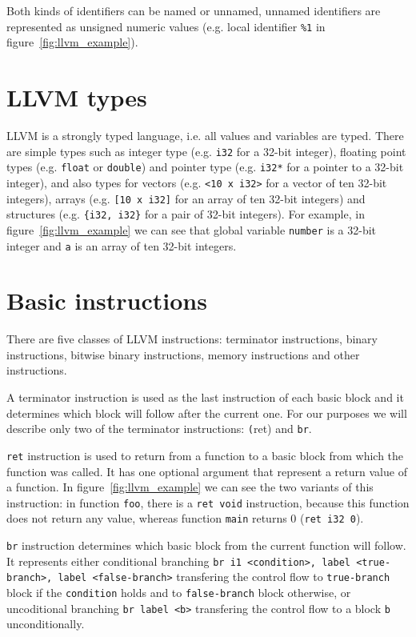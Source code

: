 Both kinds of identifiers can be named or unnamed, unnamed identifiers are
represented as unsigned numeric values (e.g. local identifier \texttt{\%1} in
figure~\ref{fig:llvm_example}).

\section{LLVM types}

LLVM is a strongly typed language, i.e. all values and variables are typed.
There are simple types such as integer type (e.g. \texttt{i32} for a 32-bit
integer), floating point types (e.g. \texttt{float} or \texttt{double}) and
pointer type (e.g. \texttt{i32*} for a pointer to a 32-bit integer), and also
types for vectors (e.g. \texttt{<10 x i32>} for a vector of ten 32-bit
integers), arrays (e.g. \texttt{[10 x i32]} for an array of ten 32-bit integers)
and structures (e.g. \texttt{\{i32, i32\}} for a pair of 32-bit integers). For
example, in figure~\ref{fig:llvm_example} we can see that global variable
\texttt{number} is a 32-bit integer and \texttt{a} is an array of ten
32-bit integers.

\section{Basic instructions}

There are five classes of LLVM instructions: terminator instructions, binary
instructions, bitwise binary instructions, memory instructions and other
instructions.

A terminator instruction is used as the last instruction of each basic block
and it determines which block will follow after the current one. For our
purposes we will describe only two of the terminator instructions: \texttt(ret)
and \texttt{br}.

\texttt{ret} instruction is used to return from a function to a basic block
from which the function was called. It has one optional argument that represent
a return value of a function. In figure~\ref{fig:llvm_example} we can see the
two variants of this instruction: in function \texttt{foo}, there is a
\texttt{ret void} instruction, because this function does not return any value,
whereas function \texttt{main} returns 0 (\texttt{ret i32 0}).

\texttt{br} instruction determines which basic block from the current function
will follow. It represents either conditional branching \texttt{br i1
<condition>, label <true-branch>, label <false-branch>} transfering the control
flow to \texttt{true-branch} block if the \texttt{condition} holds and to
\texttt{false-branch} block otherwise, or uncoditional branching \texttt{br
label <b>} transfering the control flow to a block \texttt{b} unconditionally.

